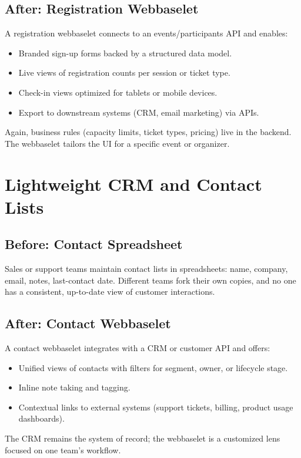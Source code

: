 \subsection*{After: Registration Webbaselet}
A registration webbaselet connects to an events/participants API
and enables:
\begin{itemize}
  \item Branded sign-up forms backed by a structured data model.
  \item Live views of registration counts per session or ticket type.
  \item Check-in views optimized for tablets or mobile devices.
  \item Export to downstream systems (CRM, email marketing) via APIs.
\end{itemize}
Again, business rules (capacity limits, ticket types, pricing) live
in the backend. The webbaselet tailors the UI for a specific event
or organizer.

\section{Lightweight CRM and Contact Lists}

\subsection*{Before: Contact Spreadsheet}
Sales or support teams maintain contact lists in spreadsheets: name,
company, email, notes, last-contact date. Different teams fork their
own copies, and no one has a consistent, up-to-date view of customer
interactions.

\subsection*{After: Contact Webbaselet}
A contact webbaselet integrates with a CRM or customer API and
offers:
\begin{itemize}
  \item Unified views of contacts with filters for segment, owner,
        or lifecycle stage.
  \item Inline note taking and tagging.
  \item Contextual links to external systems (support tickets,
        billing, product usage dashboards).
\end{itemize}
The CRM remains the system of record; the webbaselet is a customized
lens focused on one team’s workflow.

